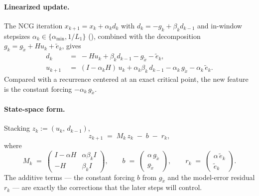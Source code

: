 \documentclass[11pt,a4paper]{article}
\theoremstyle{plain}
\theoremstyle{definition}
\newcommand{\Lone}{L_{1}}
\newcommand{\snap}{\tilde{x}}
\newcommand{\amin}{\alpha_{\min}}
\begin{document}
\paragraph{Linearized update.}
The NCG iteration $x_{k+1}=x_{k}+\alpha_{k} d_{k}$ with
$d_{k}=-g_{k}+\beta_{k}d_{k-1}$ and in-window stepsizes
$\alpha_{k}\in\{\amin,1/\Lone\}$ (), combined with the
decomposition $g_{k}=g_{\snap}+Hu_{k}+\tilde e_{k}$, gives
\begin{align}
d_{k} &\;=\; -H u_{k} + \beta_{k}d_{k-1} - g_{\snap} - \tilde e_{k},
\label{eq:dk-snap}\\[2pt]
u_{k+1} &\;=\; (I-\alpha_k H)\,u_{k} + \alpha_k\beta_{k}\,d_{k-1}
              - \alpha_k\,g_{\snap} - \alpha_k\,\tilde e_{k}.
\label{eq:uk-snap}
\end{align}
Compared with a recurrence centered at an exact critical point, the new
feature is the constant forcing $-\alpha_k\,g_{\snap}$.

\paragraph{State-space form.}
Stacking $z_{k}:=(u_{k},\,d_{k-1})$,
\begin{equation}\label{eq:state-space}
z_{k+1} \;=\; M_{k}\,z_{k} \;-\; b \;-\; r_{k},
\end{equation}
where
\begin{equation}\label{eq:Mblock}
M_{k} \;=\; \begin{pmatrix}
   I-\alpha H & \alpha\beta_{k}I \\ -H & \beta_{k}I
\end{pmatrix},
\qquad
b \;=\; \begin{pmatrix} \alpha\,g_{\snap} \\ g_{\snap}\end{pmatrix},
\qquad
r_{k} \;=\; \begin{pmatrix} \alpha\,\tilde e_{k} \\ \tilde e_{k}\end{pmatrix}.
\end{equation}
The additive terms --- the constant forcing $b$ from $g_{\snap}$ and the
model-error residual $r_{k}$ --- are exactly the corrections that the later steps
will control.
\end{document}
